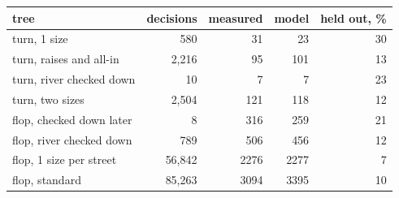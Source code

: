 \begin{tabular}{lrrrr}
\toprule
tree & decisions & measured & model & held out, \% \\ \midrule
turn, 1 size & 580 & 31 & 23 & 30 \\
turn, raises and all-in & 2,216 & 95 & 101 & 13 \\
turn, river checked down & 10 & 7 & 7 & 23 \\
turn, two sizes & 2,504 & 121 & 118 & 12 \\
flop, checked down later & 8 & 316 & 259 & 21 \\
flop, river checked down & 789 & 506 & 456 & 12 \\
flop, 1 size per street & 56,842 & 2276 & 2277 & 7 \\
flop, standard & 85,263 & 3094 & 3395 & 10 \\
\bottomrule
\end{tabular}
